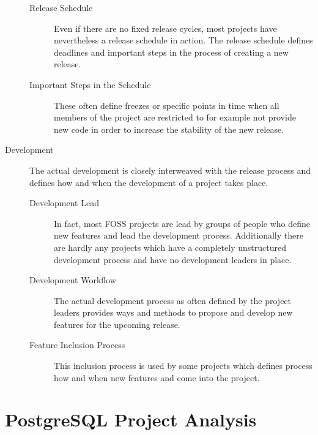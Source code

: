 \begin{description}
\begin{description}
    \item[Release Schedule] Even if there are no fixed release cycles, most
      projects have nevertheless a release schedule in action. The release
      schedule defines deadlines and important steps in the process of creating
      a new release.

    \item[Important Steps in the Schedule] These often define freezes or
      specific points in time when all members of the project are restricted to
      for example not provide new code in order to increase the stability of
      the new release.

  \end{description}

  \item[Development] The actual development is closely interweaved with the
    release process and defines how and when the development of a project takes
    place.

  \begin{description}

    \item[Development Lead] In fact, most FOSS projects are lead by groups of
      people who define new features and lead the development process.
      Additionally there are hardly any projects which have a completely
      unstructured development process and have no development leaders in
      place.

    \item[Development Workflow] The actual development process as often defined
      by the project leaders provides ways and methods to propose and develop
      new features for the upcoming release.

    \item[Feature Inclusion Process] This inclusion process is used by some
      projects which defines process how and when new features and come into
      the project.

  \end{description}

\end{description}


\section{PostgreSQL Project Analysis} %


